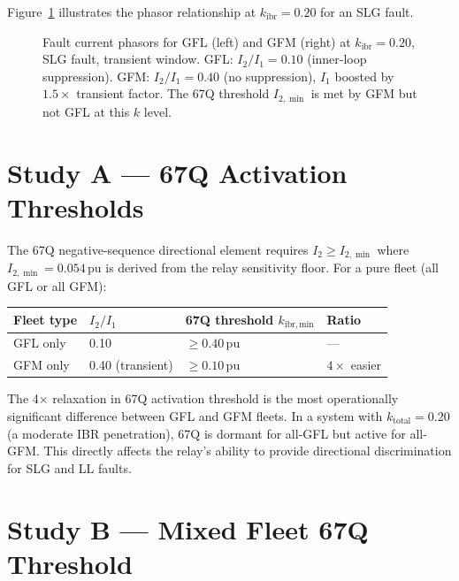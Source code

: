 \documentclass[11pt,a4paper]{article}
\begin{document}
Figure~\ref{fig:phasor} illustrates the phasor relationship at
$k_\mathrm{ibr}=0.20$ for an SLG fault.

\begin{figure}[htbp]
  \centering
  \resizebox{0.96\textwidth}{!}{}
  \caption{Fault current phasors for GFL (left) and GFM (right) at
           $k_\mathrm{ibr}=0.20$, SLG fault, transient window.
           GFL: $I_2/I_1=0.10$ (inner-loop suppression).
           GFM: $I_2/I_1=0.40$ (no suppression), $I_1$ boosted by $1.5\times$
           transient factor.  The 67Q threshold $I_{2,\min}$ is met by GFM
           but not GFL at this $k$ level.}
  \label{fig:phasor}
\end{figure}

\section{Study A --- 67Q Activation Thresholds}
\label{sec:studyA}

The 67Q negative-sequence directional element requires $I_2 \geq I_{2,\min}$
where $I_{2,\min}=0.054$\,pu is derived from the relay sensitivity floor.  For
a pure fleet (all GFL or all GFM):

\begin{center}
\begin{tabular}{@{}llll@{}}
\toprule
Fleet type & $I_2/I_1$ & 67Q threshold $k_\mathrm{ibr,min}$ & Ratio \\
\midrule
GFL only   & 0.10 & $\geq 0.40$\,pu & --- \\
GFM only   & 0.40 (transient) & $\geq 0.10$\,pu & $4\times$ easier \\
\bottomrule
\end{tabular}
\end{center}

\medskip\noindent
The 4$\times$ relaxation in 67Q activation threshold is the most operationally
significant difference between GFL and GFM fleets.  In a system with
$k_\mathrm{total}=0.20$ (a moderate IBR penetration), 67Q is dormant for all-GFL
but active for all-GFM.  This directly affects the relay's ability to provide
directional discrimination for SLG and LL faults.

\section{Study B --- Mixed Fleet 67Q Threshold}
\label{sec:studyB}
\end{document}
